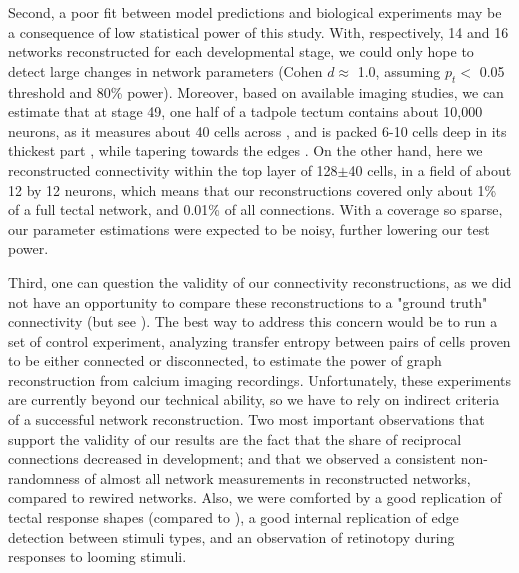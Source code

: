\documentclass{article}
\begin{document}
Second, a poor fit between model predictions and biological experiments may be a consequence of low statistical power of this study. With, respectively, 14 and 16 networks reconstructed for each developmental stage, we could only hope to detect large changes in network parameters (Cohen $d \approx$ 1.0, assuming $p_t<$ 0.05 threshold and 80\% power). Moreover, based on available imaging studies, we can estimate that at stage 49, one half of a tadpole tectum contains about 10,000 neurons, as it measures about 40 cells across \citep{hiramoto2009}, and is packed 6-10 cells deep in its thickest part \citep{hewapathirane2008vivo}, while tapering towards the edges \citep{bollmann2009}. On the other hand, here we reconstructed connectivity within the top layer of 128$\pm$40 cells, in a field of about 12 by 12 neurons, which means that our reconstructions covered only about 1\% of a full tectal network, and 0.01\% of all connections. With a coverage so sparse, our parameter estimations were expected to be noisy, further lowering our test power.

Third, one can question the validity of our connectivity reconstructions, as we did not have an opportunity to compare these reconstructions to a "ground truth" connectivity (but see \citealt{xu2011}). The best way to address this concern would be to run a set of control experiment, analyzing transfer entropy between pairs of cells proven to be either connected or disconnected, to estimate the power of graph reconstruction from calcium imaging recordings. Unfortunately, these experiments are currently beyond our technical ability, so we have to rely on indirect criteria of a successful network reconstruction. Two most important observations that support the validity of our results are the fact that the share of reciprocal connections decreased in development; and that we observed a consistent non-randomness of almost all network measurements in reconstructed networks, compared to rewired networks. Also, we were comforted by a good replication of tectal response shapes (compared to \citealt{khakhalin2014}), a good internal replication of edge detection between stimuli types, and an observation of retinotopy during responses to looming stimuli.

\end{document}
